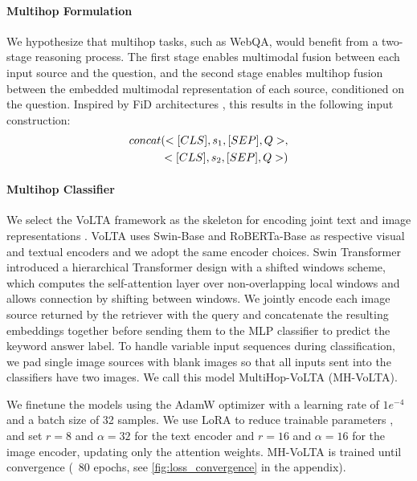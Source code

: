 \paragraph{Multihop Formulation}
We hypothesize that multihop tasks, such as WebQA, would benefit from a two-stage reasoning process. The first stage enables multimodal fusion between each input source and the question, and the second stage enables multihop fusion between the embedded multimodal representation of each source, conditioned on the question. Inspired by FiD architectures \citep{yu_kg-fid_2022}, this results in the following input construction:
\vspace{-2mm}
\begin{equation}
\begin{aligned}
    concat(<[CLS], s_1, [SEP], Q>,\\
    <[CLS], s_2, [SEP], Q>)
    \vspace{-1.5mm}
\end{aligned}
\end{equation}


\paragraph{Multihop Classifier}
\label{sec:mh-volta}
We select the VoLTA framework as the skeleton for encoding joint text and image representations \cite{pramanick_volta_2023}. VoLTA uses Swin-Base \cite{liu2021swin} and RoBERTa-Base \cite{liu2019roberta} as respective visual and textual encoders and we adopt the same encoder choices. Swin Transformer introduced a hierarchical Transformer design with a shifted windows scheme, which computes the self-attention layer over non-overlapping local windows and allows connection by shifting between windows. We jointly encode each image source returned by the retriever with the query and concatenate the resulting embeddings together before sending them to the MLP classifier to predict the keyword answer label. To handle variable input sequences during classification, we pad single image sources with blank images so that all inputs sent into the classifiers have two images. We call this model MultiHop-VoLTA (MH-VoLTA).

We finetune the models using the AdamW \cite{loshchilov2019decoupled} optimizer with a learning rate of $1e^{-4}$ and a batch size of 32 samples. We use LoRA to reduce trainable parameters \cite{hu2021lora}, and set $r=8$ and $\alpha=32$ for the text encoder and $r=16$ and $\alpha=16$ for the image encoder, updating only the attention weights. MH-VoLTA is trained until convergence (~80 epochs, see \autoref{fig:loss_convergence} in the appendix). 

